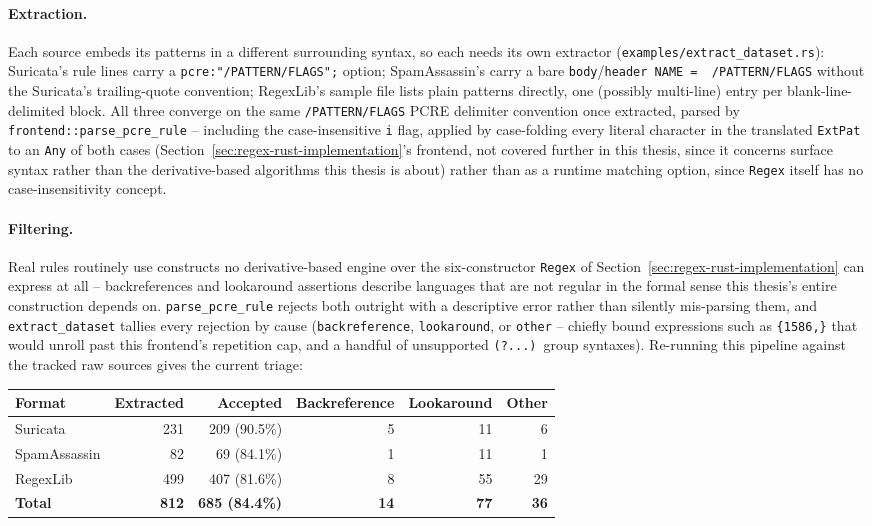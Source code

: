 \paragraph{Extraction.} Each source embeds its patterns in a different
surrounding syntax, so each needs its own extractor
(\texttt{examples/extract\_dataset.rs}): Suricata's rule lines carry a
\texttt{pcre:"/PATTERN/FLAGS";} option; SpamAssassin's carry a bare
\texttt{body}/\texttt{header NAME =~ /PATTERN/FLAGS} without the
Suricata's trailing-quote convention; RegexLib's sample file lists plain
patterns directly, one (possibly multi-line) entry per blank-line-delimited
block. All three converge on the same \texttt{/PATTERN/FLAGS} PCRE
delimiter convention once extracted, parsed by
\texttt{frontend::parse\_pcre\_rule} -- including the case-insensitive
\texttt{i} flag, applied by case-folding every literal character in the
translated \texttt{ExtPat} to an \texttt{Any} of both cases
(Section~\ref{sec:regex-rust-implementation}'s frontend, not covered
further in this thesis, since it concerns surface syntax rather than
the derivative-based algorithms this thesis is about) rather than as a
runtime matching option, since \texttt{Regex} itself has no
case-insensitivity concept.

\paragraph{Filtering.} Real rules routinely use constructs no
derivative-based engine over the six-constructor \texttt{Regex} of
Section~\ref{sec:regex-rust-implementation} can express at all --
backreferences and lookaround assertions describe languages that are
not regular in the formal sense this thesis's entire construction
depends on. \texttt{parse\_pcre\_rule} rejects both outright with a
descriptive error rather than silently mis-parsing them, and
\texttt{extract\_dataset} tallies every rejection by cause
(\texttt{backreference}, \texttt{lookaround}, or \texttt{other} --
chiefly bound expressions such as \texttt{\{1586,\}} that would unroll
past this frontend's repetition cap, and a handful of unsupported
\texttt{(?...)}~group syntaxes). Re-running this pipeline against the
tracked raw sources gives the current triage:

\begin{center}
\begin{tabular}{lrrrrr}
\hline
Format & Extracted & Accepted & Backreference & Lookaround & Other \\
\hline
Suricata & 231 & 209 (90.5\%) & 5 & 11 & 6 \\
SpamAssassin & 82 & 69 (84.1\%) & 1 & 11 & 1 \\
RegexLib & 499 & 407 (81.6\%) & 8 & 55 & 29 \\
\hline
\textbf{Total} & \textbf{812} & \textbf{685 (84.4\%)} & \textbf{14} & \textbf{77} & \textbf{36} \\
\hline
\end{tabular}
\end{center}

